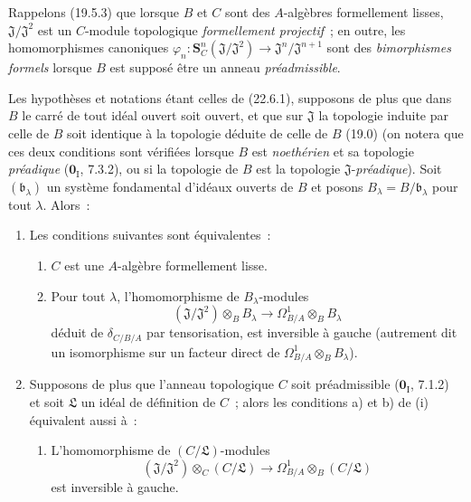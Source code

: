 Rappelons (19.5.3) que lorsque $B$ et $C$ sont des $A$-algèbres formellement
lisses, $\mathfrak J/\mathfrak J^2$ est un $C$-module topologique
\emph{formellement projectif}~; en outre, les homomorphismes canoniques
$\varphi_n:\mathbf S_C^n(\mathfrak J/\mathfrak J^2)
\longrightarrow\mathfrak J^n/\mathfrak J^{n+1}$ sont des
\emph{bimorphismes formels} lorsque $B$ est supposé être un anneau
\emph{préadmissible}.
\begin{corollary}[22.6.2]
\label{0.22.6.2-fr}
Les hypothèses et notations étant celles de \textup{(22.6.1)}, supposons de plus que
dans $B$ le carré de tout idéal ouvert soit ouvert, et que sur $\mathfrak J$ la
topologie induite par celle de $B$ soit identique à la topologie déduite de
celle de $B$ \textup{(19.0)} \textup{(on notera que ces deux conditions sont vérifiées lorsque
$B$ est \emph{noethérien} et sa topologie \emph{préadique} ($\mathbf{0}_{\mathrm I}$, 7.3.2), ou si la
topologie de $B$ est la topologie $\mathfrak J$-\emph{préadique})}. Soit
$(\mathfrak b_\lambda)$ un système fondamental d'idéaux ouverts de $B$ et
posons $B_\lambda=B/\mathfrak b_\lambda$ pour tout $\lambda$. Alors~:
\begin{enumerate}
  \item[\rm(i)] Les conditions suivantes sont équivalentes~:
  \begin{enumerate}
    \item[\textup{a)}] $C$ est une $A$-algèbre formellement lisse.
    \item[\textup{b)}] Pour tout $\lambda$, l'homomorphisme de $B_\lambda$-modules
    \begin{equation}
    \label{0.22.6.2.1-fr}
      (\mathfrak J/\mathfrak J^2)\otimes_BB_\lambda
      \longrightarrow\Omega^1_{B/A}\otimes_BB_\lambda
      \tag{22.6.2.1}
    \end{equation}
    déduit de $\delta_{C/B/A}$ par tensorisation, est inversible à gauche
    \textup{(autrement dit un isomorphisme sur un facteur direct de
    $\Omega^1_{B/A}\otimes_BB_\lambda$)}.
  \end{enumerate}
  \item[\rm(ii)] Supposons de plus que l'anneau topologique $C$ soit
  préadmissible \textup{($\mathbf{0}_{\mathrm I}$, 7.1.2)} et
  soit $\mathfrak L$ un idéal de définition de $C$~; alors les conditions \textup{a)}
  et \textup{b)} de \textup{(i)} équivalent aussi à~:
  \begin{enumerate}
    \item[\textup{c)}] L'homomorphisme de $(C/\mathfrak L)$-modules
    \[
      (\mathfrak J/\mathfrak J^2)\otimes_C(C/\mathfrak L)
      \longrightarrow\Omega^1_{B/A}\otimes_B(C/\mathfrak L)
    \]
    est inversible à gauche.
  \end{enumerate}
\end{enumerate}
\end{corollary}

